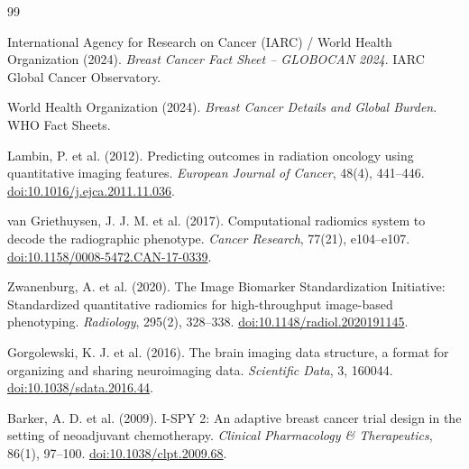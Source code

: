 \documentclass[12pt,a4paper]{report}
\begin{document}
    \clearpage
    \begin{thebibliography}{99}

        International Agency for Research on Cancer (IARC) / World Health Organization (2024).
        \newblock \emph{Breast Cancer Fact Sheet – GLOBOCAN 2024}.
        \newblock IARC Global Cancer Observatory.

        World Health Organization (2024).
        \newblock \emph{Breast Cancer Details and Global Burden}.
        \newblock WHO Fact Sheets.

        Lambin, P. et al. (2012).
        \newblock Predicting outcomes in radiation oncology using quantitative imaging features.
        \newblock \emph{European Journal of Cancer}, 48(4), 441–446. \href{https://doi.org/10.1016/j.ejca.2011.11.036}{doi:10.1016/j.ejca.2011.11.036}.

        van Griethuysen, J. J. M. et al. (2017).
        \newblock Computational radiomics system to decode the radiographic phenotype.
        \newblock \emph{Cancer Research}, 77(21), e104–e107. \href{https://doi.org/10.1158/0008-5472.CAN-17-0339}{doi:10.1158/0008-5472.CAN-17-0339}.

        Zwanenburg, A. et al. (2020).
        \newblock The Image Biomarker Standardization Initiative: Standardized quantitative radiomics for high-throughput image-based phenotyping.
        \newblock \emph{Radiology}, 295(2), 328–338. \href{https://doi.org/10.1148/radiol.2020191145}{doi:10.1148/radiol.2020191145}.

        Gorgolewski, K. J. et al. (2016).
        \newblock The brain imaging data structure, a format for organizing and sharing neuroimaging data.
        \newblock \emph{Scientific Data}, 3, 160044. \href{https://doi.org/10.1038/sdata.2016.44}{doi:10.1038/sdata.2016.44}.

        Barker, A. D. et al. (2009).
        \newblock I-SPY 2: An adaptive breast cancer trial design in the setting of neoadjuvant chemotherapy.
        \newblock \emph{Clinical Pharmacology \& Therapeutics}, 86(1), 97–100. \href{https://doi.org/10.1038/clpt.2009.68}{doi:10.1038/clpt.2009.68}.


\end{thebibliography}
\end{document}
